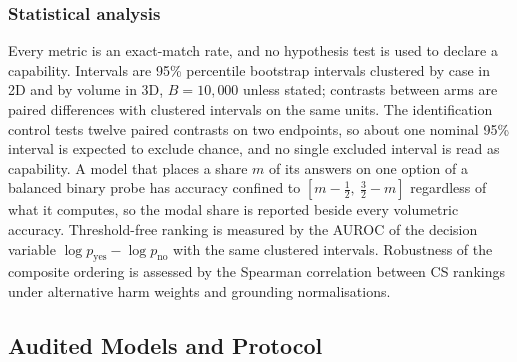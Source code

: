 \subsubsection{Statistical analysis} Every metric is an exact-match rate,
and no hypothesis test is used to declare a capability. Intervals are 95\%
percentile bootstrap intervals clustered by case in 2D and by volume in 3D,
$B=10{,}000$ unless stated; contrasts between arms are paired differences
with clustered intervals on the same units. The identification control
tests twelve paired contrasts on two endpoints, so about one nominal 95\%
interval is expected to exclude chance, and no single excluded interval is
read as capability. A model that places a share $m$ of its answers on one
option of a balanced binary probe has accuracy confined to
$[m-\tfrac12,\ \tfrac32-m]$ regardless of what it computes, so the modal
share is reported beside every volumetric accuracy. Threshold-free ranking is measured
by the AUROC of the decision variable $\log p_{\text{yes}}-\log p_{\text{no}}$
with the same clustered intervals. Robustness of the composite ordering is
assessed by the Spearman correlation between CS rankings under alternative
harm weights and grounding normalisations.

\subsection{Audited Models and Protocol}
\label{sec:protocol}

